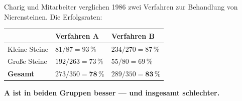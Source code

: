 \begin{merksatz}
Charig und Mitarbeiter verglichen 1986 zwei Verfahren zur Behandlung von Nierensteinen. Die Erfolgsraten:

\begin{center}
{\small
\renewcommand{\arraystretch}{1.48}
\begin{tabular}{@{}P{2.6cm}P{2.6cm}P{2.6cm}@{}}
\toprule
& \textbf{Verfahren A} & \textbf{Verfahren B}\\
\midrule
Kleine Steine & $81/87 = 93\,\%$ & $234/270 = 87\,\%$\\
Große Steine & $192/263 = 73\,\%$ & $55/80 = 69\,\%$\\
\midrule
\textbf{Gesamt} & $273/350 = \mathbf{78\,\%}$ & $289/350 = \mathbf{83\,\%}$\\
\bottomrule
\end{tabular}}
\end{center}

\begin{center}
\begin{minipage}{0.9\textwidth}
\textbf{A ist in beiden Gruppen besser --- und insgesamt schlechter.}
\end{minipage}
\end{center}
\end{merksatz}

